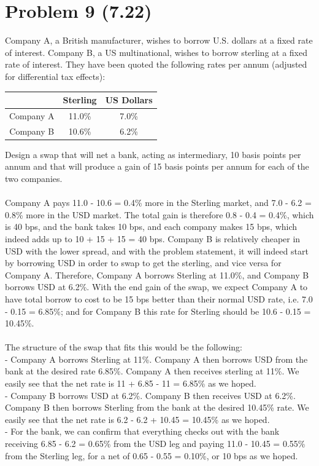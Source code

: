 \documentclass{article}
\begin{document}
{\Large 

\section*{Problem 9 (7.22)}
Company A, a British manufacturer, wishes to borrow U.S. dollars at a fixed rate of interest. Company B, a US multinational, wishes to borrow sterling at a fixed rate of interest. They have been quoted the following rates per annum (adjusted for differential tax effects):
\begin{center}
\begin{tabular}{ |c|c|c| } 
 \hline
  & Sterling & US Dollars \\ 
 \hline
 Company A & 11.0\% & 7.0\% \\ 
 \hline
 Company B & 10.6\% & 6.2\% \\ 
 \hline
\end{tabular}
\end{center}
Design a swap that will net a bank, acting as intermediary, 10 basis points per annum and that will produce a gain of 15 basis points per annum for each of the two companies. \\ \\
Company A pays 11.0 - 10.6 = 0.4\% more in the Sterling market, and 7.0 - 6.2 = 0.8\% more in the USD market. The total gain is therefore 0.8 - 0.4 = 0.4\%, which is 40 bps, and the bank takes 10 bps, and each company makes 15 bps, which indeed adds up to 10 + 15 + 15 = 40 bps. Company B is relatively cheaper in USD with the lower spread, and with the problem statement, it will indeed start by borrowing USD in order to swap to get the sterling, and vice versa for Company A. Therefore, Company A borrows Sterling at 11.0\%, and Company B borrows USD at 6.2\%. With the end gain of the swap, we expect Company A to have total borrow to cost to be 15 bps better than their normal USD rate, i.e. 7.0 - 0.15 = 6.85\%; and for Company B this rate for Sterling should be 10.6 - 0.15 = 10.45\%. \\ \\
The structure of the swap that fits this would be the following: \\
- Company A borrows Sterling at 11\%. Company A then borrows USD from the bank at the desired rate 6.85\%. Company A then receives sterling at 11\%. We easily see that the net rate is 11 + 6.85 - 11 = 6.85\% as we hoped. \\
- Company B borrows USD at 6.2\%. Company B then receives USD at 6.2\%. Company B then borrows Sterling from the bank at the desired 10.45\% rate. We easily see that the net rate is 6.2 - 6.2 + 10.45 = 10.45\% as we hoped. \\
- For the bank, we can confirm that everything checks out with the bank receiving 6.85 - 6.2 = 0.65\% from the USD leg and paying 11.0 - 10.45 = 0.55\% from the Sterling leg, for a net of 0.65 - 0.55 = 0.10\%, or 10 bps as we hoped.

}
\end{document}
